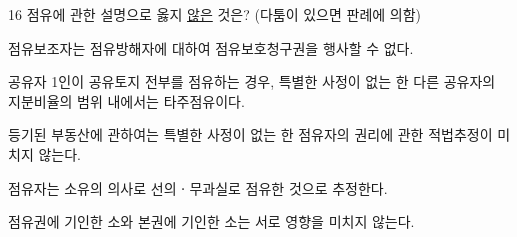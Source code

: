 \begin{question}{16}
점유에 관한 설명으로 옳지 \uline{않은} 것은? (다툼이 있으면 판례에 의함)
\begin{choices}
  \item 점유보조자는 점유방해자에 대하여 점유보호청구권을 행사할 수 없다.
  \item 공유자 1인이 공유토지 전부를 점유하는 경우, 특별한 사정이 없는 한 다른 공유자의 지분비율의 범위 내에서는 타주점유이다.
  \item 등기된 부동산에 관하여는 특별한 사정이 없는 한 점유자의 권리에 관한 적법추정이 미치지 않는다.
  \item 점유자는 소유의 의사로 선의ㆍ무과실로 점유한 것으로 추정한다.
  \item 점유권에 기인한 소와 본권에 기인한 소는 서로 영향을 미치지 않는다.
\end{choices}
\end{question}
